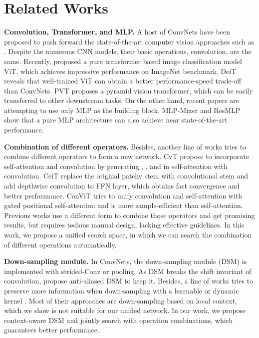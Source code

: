 \documentclass{article} \usepackage{iclr2022_conference,times}
\begin{document}
\section{Related Works}
\label{related_works}

\textbf{Convolution, Transformer, and MLP.}
A host of ConvNets have been proposed to push forward the state-of-the-art computer vision approaches such as \citep{resnet,inception,efficientnet}. Despite the numerous CNN models, their basic operations, convolution, are the same. Recently, \citet{vit} proposed a pure transformer based image classification model ViT, which achieves impressive performance on ImageNet benchmark. DeiT \citep{deit} reveals that well-trained ViT can obtain a better performance-speed trade-off than ConvNets. PVT \citep{pvt} proposes a pyramid vision transformer, which can be easily transferred to other downstream tasks. On the other hand, recent papers are attempting to use only MLP as the building block. MLP-Mixer \citep{mixer} and ResMLP \citep{resmlp} show that a pure MLP architecture can also achieve near state-of-the-art performance. 

\textbf{Combination of different operators.}
Besides, another line of works tries to combine different operators to form a new network. CvT \citep{cvt} propose to incorporate self-attention and convolution by generating , , and  in self-attention with convolution. CeiT \citep{yuan2021incorporating} replace the original patchy stem with convolutional stem and add depthwise convolution to FFN layer, which obtains fast convergence and better performance. ConViT \citep{convit} tries to unify convolution and self-attention with gated positional self-attention and is more sample-efficient than self-attention. Previous works use a different form to combine those operators and get promising results, but requires tedious manual design, lacking effective guidelines. In this work, we propose a unified search space, in which we can search the combination of different operations automatically.

\textbf{Down-sampling module.}
In ConvNets, the down-sampling module (DSM) is implemented with strided-Conv or pooling.  As DSM breaks the shift invariant of convolution, \citet{zhang2019shiftinvar} propose anti-aliased DSM to keep it. Besides, a line of works tries to preserve more information when down-sampling with a learnable or dynamic kernel \citep{lip,dpp,carafe++}. Most of their approaches are down-sampling based on local context, which we show is not suitable for our unified network. In our work, we propose context-aware DSM and jointly search with operation combinations, which guarantees better performance.
\end{document}
